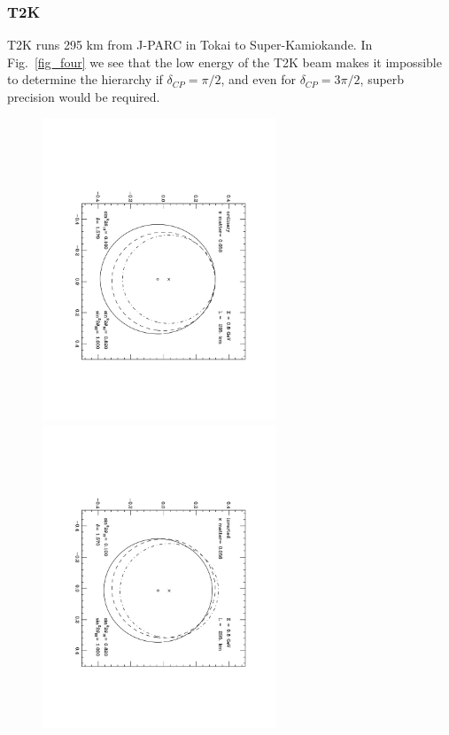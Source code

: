 \subsubsection{T2K}
T2K runs 295 km from J-PARC in Tokai to Super-Kamiokande.   In Fig.~\ref{fig_four} we see that the low energy of the T2K beam makes it impossible to determine the hierarchy if $\delta_{CP}=\pi/2$, and even for $\delta_{CP}=3\pi/2$, superb precision would be required.
\begin{figure}\begin{center}
\includegraphics[width=2.75in,angle=90]{RNC/cpv_t2k_pibytwo.pdf}
\includegraphics[width=2.75in,angle=90]{RNC/cpv_t2k_pibytwo_inv.pdf}


\end{center}
\end{figure}
